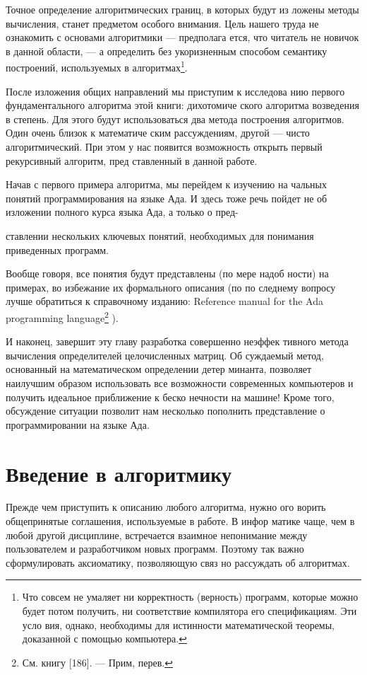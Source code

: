 	Точное определение алгоритмических границ, в которых будут из­
	ложены методы вычисления, станет предметом особого внимания. Цель
	нашего труда не ознакомить с основами алгоритмики — предполага­
	ется, что читатель не новичок в данной области, — а определить без­
	укоризненным способом семантику построений, используемых в алгоритмах\footnote{Что совсем не умаляет ни корректность (верность) программ, которые можно
	будет потом получить, ни соответствие компилятора его спецификациям. Эти усло­
	вия,  однако, необходимы для  истинности математической теоремы,  доказанной с
	помощью компьютера.}.
	
	После изложения общих направлений мы приступим к исследова­
	нию первого фундаментального алгоритма этой книги: дихотомиче­
	ского алгоритма возведения в степень. Для этого будут использоваться
	два метода построения алгоритмов. Один очень близок к математиче­
	ским рассуждениям, другой — чисто алгоритмический. При этом у нас
	появится возможность открыть первый рекурсивный алгоритм, пред­
	ставленный в данной работе.
	
	\parindent=1cm Начав с первого примера алгоритма, мы перейдем к изучению на­
	чальных понятий программирования на языке Ада. И здесь тоже речь
	пойдет не об изложении полного курса языка Ада, а только о пред-
	
	\pagebreak
	\noindent ставлении нескольких ключевых понятий, необходимых для понимания
	приведенных программ.
	
	\parindent=1cm Вообще говоря, все понятия будут представлены (по мере надоб­
	ности) на примерах, во избежание их формального описания (по по­
	следнему вопросу лучше обратиться к справочному изданию: Reference
	manual for the Ada programming language\footnote{См. книгу [186]. — Прим, перев.} ).
	
	\parindent=1cm И наконец, завершит эту главу разработка совершенно неэффек­
	тивного метода вычисления определителей целочисленных матриц. Об­
	суждаемый метод, основанный на математическом определении детер­
	минанта, позволяет наилучшим образом использовать все возможности
	современных компьютеров и получить идеальное приближение к беско­
	нечности на машине! Кроме того, обсуждение ситуации позволит нам
	несколько пополнить представление о программировании на языке Ада.
	
	\section{Введение в алгоритмику}
	\noindent Прежде чем приступить к описанию любого алгоритма, нужно ого­
	ворить общепринятые соглашения, используемые в работе. В инфор­
	матике чаще, чем в любой другой дисциплине, встречается взаимное
	непонимание между пользователем и разработчиком новых программ.
	Поэтому так важно сформулировать аксиоматику, позволяющую связ­
	но рассуждать об алгоритмах.
	
